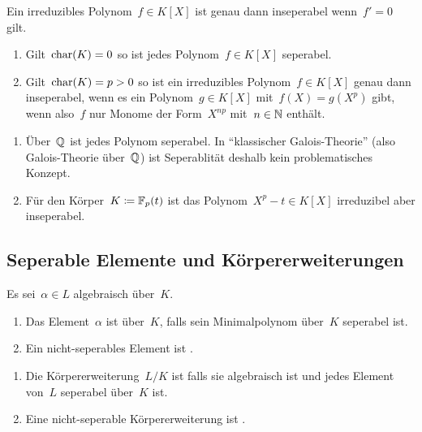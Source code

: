 \begin{lemma}
  Ein irreduzibles Polynom~$f \in K[X]$ ist genau dann inseperabel wenn~$f' = 0$ gilt.
\end{lemma}

\begin{proposition}
  \leavevmode
  \begin{enumerate}
    \item
      Gilt~$\operatorname{char}(K) = 0$ so ist jedes Polynom~$f \in K[X]$ seperabel.
    \item
      Gilt~$\operatorname{char}(K) = p > 0$ so ist ein irreduzibles Polynom~$f \in K[X]$ genau dann inseperabel, wenn es ein Polynom~$g \in K[X]$ mit~$f(X) = g(X^p)$ gibt, wenn also~$f$ nur Monome der Form~$X^{np}$ mit~$n \in \mathbb{N}$ enthält.
  \end{enumerate}
\end{proposition}

\begin{example}
  \leavevmode
  \begin{enumerate}
    \item
      Über~$\mathbb{Q}$ ist jedes Polynom seperabel.
      In \enquote{klassischer Galois-Theorie} (also Galois-Theorie über~$\mathbb{Q}$) ist Seperablität deshalb kein problematisches Konzept.
    \item
      Für den Körper~$K \coloneqq \mathbb{F}_p(t)$ ist das Polynom~$X^p - t \in K[X]$ irreduzibel aber inseperabel.
  \end{enumerate}
\end{example}



\subsection{Seperable Elemente und Körpererweiterungen}

\begin{definition}
  Es sei~$\alpha \in L$ algebraisch über~$K$.
  \begin{enumerate}
    \item
      Das Element~$\alpha$ ist  über~$K$, falls sein Minimalpolynom über~$K$ seperabel ist.
    \item
      Ein nicht-seperables Element ist .
  \end{enumerate}
\end{definition}

\begin{definition}
  \leavevmode
  \begin{enumerate}
    \item
      Die Körpererweiterung~$L/K$ ist  falls sie algebraisch ist und jedes Element von~$L$ seperabel über~$K$ ist.
    \item
      Eine nicht-seperable Körpererweiterung ist .
  \end{enumerate}
\end{definition}


